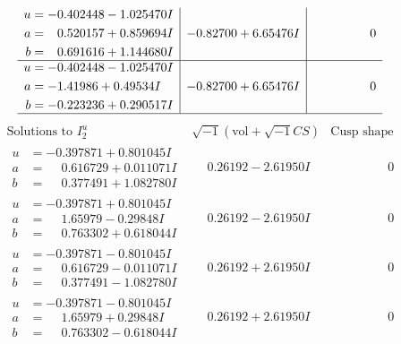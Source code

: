 \documentclass[1p]{elsarticle_modified}
\theoremstyle{definition}
\newcommand{\I}{\sqrt{-1}}
\begin{document}
$$\begin{array}{c|c|c}
\begin{aligned}
u &= -0.402448 - 1.025470 I \\
a &= \phantom{-}0.520157 + 0.859694 I \\
b &= \phantom{-}0.691616 + 1.144680 I\end{aligned}
 & -0.82700 + 6.65476 I & \phantom{-0.000000 } 0 \\ \hline\begin{aligned}
u &= -0.402448 - 1.025470 I \\
a &= -1.41986 + 0.49534 I \\
b &= -0.223236 + 0.290517 I\end{aligned}
 & -0.82700 + 6.65476 I & \phantom{-0.000000 } 0\\
 \hline 
 \end{array}$$\newpage$$\begin{array}{c|c|c}  
\text{Solutions to }I^u_{2}& \I (\text{vol} + \sqrt{-1}CS) & \text{Cusp shape}\\
 \hline 
\begin{aligned}
u &= -0.397871 + 0.801045 I \\
a &= \phantom{-}0.616729 + 0.011071 I \\
b &= \phantom{-}0.377491 + 1.082780 I\end{aligned}
 & \phantom{-}0.26192 - 2.61950 I & \phantom{-0.000000 } 0 \\ \hline\begin{aligned}
u &= -0.397871 + 0.801045 I \\
a &= \phantom{-}1.65979 - 0.29848 I \\
b &= \phantom{-}0.763302 + 0.618044 I\end{aligned}
 & \phantom{-}0.26192 - 2.61950 I & \phantom{-0.000000 } 0 \\ \hline\begin{aligned}
u &= -0.397871 - 0.801045 I \\
a &= \phantom{-}0.616729 - 0.011071 I \\
b &= \phantom{-}0.377491 - 1.082780 I\end{aligned}
 & \phantom{-}0.26192 + 2.61950 I & \phantom{-0.000000 } 0 \\ \hline\begin{aligned}
u &= -0.397871 - 0.801045 I \\
a &= \phantom{-}1.65979 + 0.29848 I \\
b &= \phantom{-}0.763302 - 0.618044 I\end{aligned}
 & \phantom{-}0.26192 + 2.61950 I & \phantom{-0.000000 } 0 \\ \hline\begin{aligned}

\end{aligned}
\end{array}$$
\end{document}
